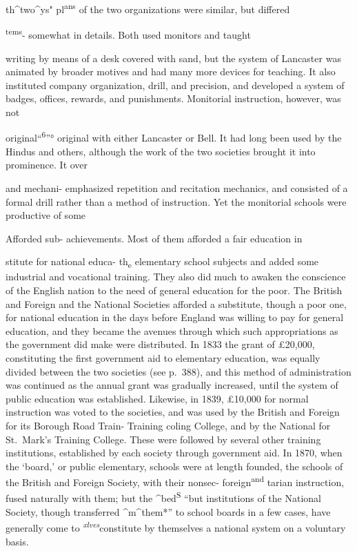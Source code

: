 \documentclass[]{book}
\begin{document}
th\^{}two\^{}ys" pl\textsuperscript{ans} of the two organizations were similar, but differed

\textsuperscript{tems}- somewhat in details. Both used monitors and taught

writing by means of a desk covered with sand, but the system of Lancaster was animated by broader motives and had many more devices for teaching. It also instituted company organization, drill, and precision, and developed a system of badges, offices, rewards, and punishments. Monitorial instruction, however, was not

original``\textsuperscript{6}''° original with either Lancaster or Bell. It had long been used by the Hindus and others, although the work of the two societies brought it into prominence. It over

and mechani- emphasized repetition and recitation mechanics, and consisted of a formal drill rather than a method of instruction. Yet the monitorial schools were productive of some

Afforded sub- achievements. Most of them afforded a fair education in

stitute for national educa- th\textsubscript{e} elementary school subjects and added some industrial and vocational training. They also did much to awaken the conscience of the English nation to the need of general education for the poor. The British and Foreign and the National Societies afforded a substitute, though a poor one, for national education in the days before England was willing to pay for general education, and they became the avenues through which such appropriations as the government did make were distributed. In 1833 the grant of £20,000, constituting the first government aid to elementary education, was equally divided between the two societies (see p.~388), and this method of administration was continued as the annual grant was\protect\hypertarget{ch20.xmlux5cux23para.300.1.0.box.144.248.1265.799.q.60}{}{ gradually increased, until the system of public education was established. Likewise, in 1839, £10,000 for normal instruction was voted to the societies, and was used by the British and Foreign for its Borough Road Train- Training coling College, and by the National for St.~Mark's Training College. These were followed by several other training institutions, established by each society through government aid. In 1870, when the `board,' or public elementary, schools were at length founded, the schools of the British and Foreign Society, with their nonsec- foreign\textsuperscript{and} tarian instruction, fused naturally with them; but the \^{}bed\textsuperscript{S} ``but institutions of the National Society, though transferred \^{}m\^{}them*'' to school boards in a few cases, have generally come to \emph{\textsuperscript{xlves}}constitute by themselves a national system on a voluntary basis.}
\end{document}
